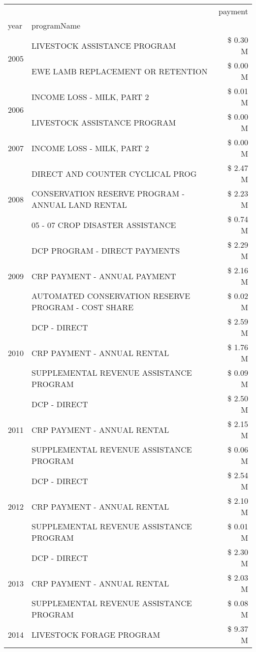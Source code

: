 \begin{tabular}{llr}
\toprule
 &  & payment \\
year & programName &  \\
\midrule
\multirow[t]{2}{*}{2005} & LIVESTOCK ASSISTANCE PROGRAM & \$ 0.30 M \\
 & EWE LAMB REPLACEMENT OR RETENTION & \$ 0.00 M \\
\cline{1-3}
\multirow[t]{2}{*}{2006} & INCOME LOSS - MILK, PART 2 & \$ 0.01 M \\
 & LIVESTOCK ASSISTANCE PROGRAM & \$ 0.00 M \\
\cline{1-3}
2007 & INCOME LOSS - MILK, PART 2 & \$ 0.00 M \\
\cline{1-3}
\multirow[t]{3}{*}{2008} & DIRECT AND COUNTER CYCLICAL PROG & \$ 2.47 M \\
 & CONSERVATION RESERVE PROGRAM - ANNUAL LAND RENTAL & \$ 2.23 M \\
 & 05 - 07 CROP DISASTER ASSISTANCE & \$ 0.74 M \\
\cline{1-3}
\multirow[t]{3}{*}{2009} & DCP PROGRAM - DIRECT PAYMENTS & \$ 2.29 M \\
 & CRP PAYMENT - ANNUAL PAYMENT & \$ 2.16 M \\
 & AUTOMATED CONSERVATION RESERVE PROGRAM - COST SHARE & \$ 0.02 M \\
\cline{1-3}
\multirow[t]{3}{*}{2010} & DCP - DIRECT & \$ 2.59 M \\
 & CRP PAYMENT - ANNUAL RENTAL & \$ 1.76 M \\
 & SUPPLEMENTAL REVENUE ASSISTANCE PROGRAM & \$ 0.09 M \\
\cline{1-3}
\multirow[t]{3}{*}{2011} & DCP - DIRECT & \$ 2.50 M \\
 & CRP PAYMENT - ANNUAL RENTAL & \$ 2.15 M \\
 & SUPPLEMENTAL REVENUE ASSISTANCE PROGRAM & \$ 0.06 M \\
\cline{1-3}
\multirow[t]{3}{*}{2012} & DCP - DIRECT & \$ 2.54 M \\
 & CRP PAYMENT - ANNUAL RENTAL & \$ 2.10 M \\
 & SUPPLEMENTAL REVENUE ASSISTANCE PROGRAM & \$ 0.01 M \\
\cline{1-3}
\multirow[t]{3}{*}{2013} & DCP - DIRECT & \$ 2.30 M \\
 & CRP PAYMENT - ANNUAL RENTAL & \$ 2.03 M \\
 & SUPPLEMENTAL REVENUE ASSISTANCE PROGRAM & \$ 0.08 M \\
\cline{1-3}
\multirow[t]{3}{*}{2014} & LIVESTOCK FORAGE PROGRAM & \$ 9.37 M \\

\end{tabular}
